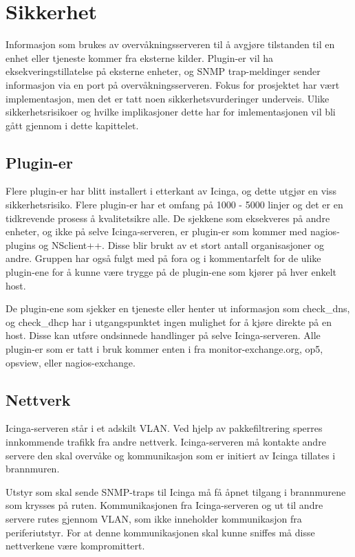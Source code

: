 \chapter{Sikkerhet}\label{chap:sikkerhet}
Informasjon som brukes av overvåkningsserveren til å avgjøre tilstanden til en enhet eller tjeneste kommer fra eksterne kilder. Plugin-er vil ha eksekveringstillatelse på eksterne enheter, og SNMP trap-meldinger sender informasjon via en port på overvåkningsserveren. Fokus for prosjektet har vært implementasjon, men det er tatt noen sikkerhetsvurderinger underveis. Ulike sikkerhetsrisikoer og hvilke implikasjoner dette har for imlementasjonen vil bli gått gjennom i dette kapittelet.
\clearpage

\section{Plugin-er}
Flere plugin-er har blitt installert i etterkant av Icinga, og dette utgjør en viss sikkerhetsrisiko. Flere plugin-er har et omfang på 1000 - 5000 linjer og det er en tidkrevende prosess å kvalitetsikre alle. De sjekkene som eksekveres på andre enheter, og ikke på selve Icinga-serveren, er plugin-er som kommer med nagios-plugins og NSclient++. Disse blir brukt av et stort antall organisasjoner og andre. Gruppen har også fulgt med på fora og i kommentarfelt for de ulike plugin-ene for å kunne være trygge på de plugin-ene som kjører på hver enkelt host. 

De plugin-ene som sjekker en tjeneste eller henter ut informasjon som check\_dns, og check\_dhcp har i utgangspunktet ingen mulighet for å kjøre direkte på en host. Disse kan utføre ondsinnede handlinger på selve Icinga-serveren. Alle plugin-er som er tatt i bruk kommer enten i fra monitor-exchange.org, op5, opsview, eller nagios-exchange.

\section{Nettverk}
Icinga-serveren står i et adskilt VLAN. Ved hjelp av pakkefiltrering sperres innkommende trafikk fra andre nettverk. Icinga-serveren må kontakte andre servere den skal overvåke og kommunikasjon som er initiert av Icinga tillates i brannmuren. 

Utstyr som skal sende SNMP-traps til Icinga må få åpnet tilgang i brannmurene som krysses på ruten. Kommunikasjonen fra Icinga-serveren og ut til andre servere rutes gjennom VLAN, som ikke inneholder kommunikasjon fra periferiutstyr. For at denne kommunikasjonen skal kunne sniffes må disse nettverkene være kompromittert.

